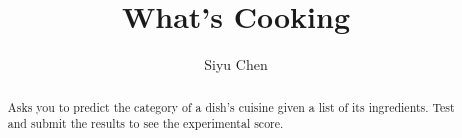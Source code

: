 \documentclass{amsart}
\begin{document}
%
%
\title[WHAT'S COOKING]{What's Cooking}%

\author{Siyu Chen}
\address[A.~1]{School of Computer Science,\\ 
Xi'an Shiyou University, Shaanxi 710065, China}%





\date{\gitAuthorDate}%

\begin{abstract}
    Asks you to predict the category of a dish's cuisine given a list of its ingredients. Test and submit the results to see the experimental score.
\end{abstract}

\maketitle

\tableofcontents

\newpage



\newpage


\end{document}
